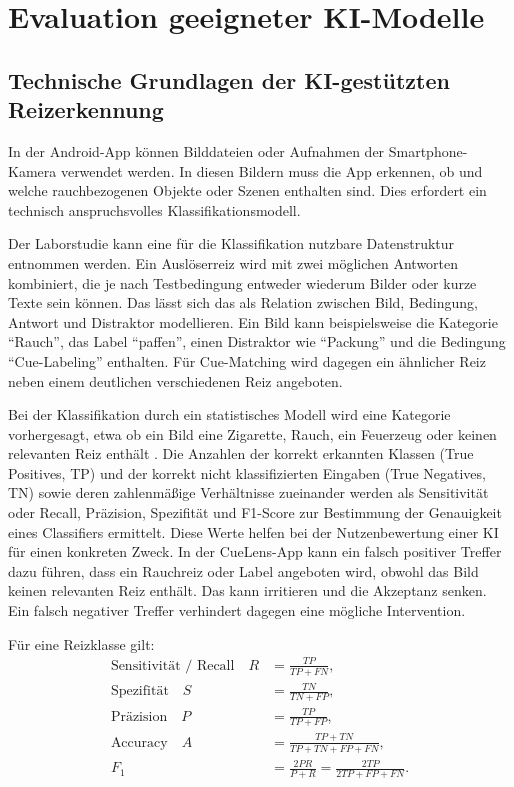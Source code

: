 

\chapter{Evaluation geeigneter KI-Modelle}
\section{Technische Grundlagen der KI-gestützten Reizerkennung}

In der Android-App können Bilddateien oder Aufnahmen der Smartphone-Kamera verwendet werden. In diesen Bildern muss die App erkennen, ob und welche rauchbezogenen Objekte oder Szenen enthalten sind. Dies erfordert ein technisch anspruchsvolles Klassifikationsmodell.

Der Laborstudie kann eine für die Klassifikation nutzbare Datenstruktur entnommen werden. Ein Auslöserreiz wird mit zwei möglichen Antworten kombiniert, die je nach Testbedingung entweder wiederum Bilder oder kurze Texte sein können. Das lässt sich das als Relation zwischen Bild, Bedingung, Antwort und Distraktor modellieren. Ein Bild kann beispielsweise die Kategorie \enquote{Rauch}, das Label \enquote{paffen}, einen Distraktor wie \enquote{Packung} und die Bedingung \enquote{Cue-Labeling} enthalten. Für Cue-Matching wird dagegen ein ähnlicher Reiz neben einem deutlichen verschiedenen Reiz angeboten.

Bei der Klassifikation durch ein statistisches Modell wird eine Kategorie vorhergesagt, etwa ob ein Bild eine Zigarette, Rauch, ein Feuerzeug oder keinen relevanten Reiz enthält \cite{james_islr_2021}. Die Anzahlen der korrekt erkannten Klassen (True Positives, TP) und der korrekt nicht klassifizierten Eingaben (True Negatives, TN) sowie deren zahlenmäßige Verhältnisse zueinander werden als Sensitivität oder Recall, Präzision, Spezifität und F1-Score zur Bestimmung der Genauigkeit eines Classifiers ermittelt. Diese Werte helfen bei der Nutzenbewertung einer KI für einen konkreten Zweck. In der CueLens-App kann ein falsch positiver Treffer dazu führen, dass ein Rauchreiz oder Label angeboten wird, obwohl das Bild keinen relevanten Reiz enthält. Das kann irritieren und die Akzeptanz senken. Ein falsch negativer Treffer verhindert dagegen eine mögliche Intervention. 

Für eine Reizklasse gilt:
\[
\begin{aligned}
	\text{Sensitivität / Recall}\quad R &= \frac{TP}{TP+FN},\\[5pt]
	\text{Spezifität}\quad S &= \frac{TN}{TN+FP},\\[5pt]
	\text{Präzision}\quad P &= \frac{TP}{TP+FP},\\[5pt]
	\text{Accuracy}\quad A &= \frac{TP+TN}{TP+TN+FP+FN},\\[5pt]
	F_1 &= \frac{2PR}{P+R}
     = \frac{2TP}{2TP+FP+FN}.
\end{aligned}
\]

